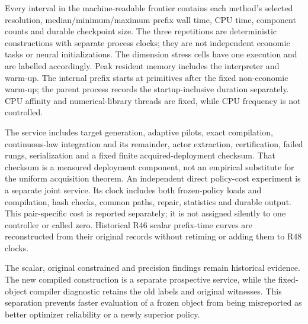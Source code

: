 Every interval in the machine-readable frontier contains each method's selected resolution, median/minimum/maximum prefix wall time, CPU time, component counts and durable checkpoint size. The three repetitions are deterministic constructions with separate process clocks; they are not independent economic tasks or neural initializations. The dimension stress cells have one execution and are labelled accordingly. Peak resident memory includes the interpreter and warm-up. The internal prefix starts at primitives after the fixed non-economic warm-up; the parent process records the startup-inclusive duration separately. CPU affinity and numerical-library threads are fixed, while CPU frequency is not controlled.

The service includes target generation, adaptive pilots, exact compilation, continuous-law integration and its remainder, actor extraction, certification, failed rungs, serialization and a fixed finite acquired-deployment checksum. That checksum is a measured deployment component, not an empirical substitute for the uniform acquisition theorem. An independent direct policy-cost experiment is a separate joint service. Its clock includes both frozen-policy loads and compilation, hash checks, common paths, repair, statistics and durable output. This pair-specific cost is reported separately; it is not assigned silently to one controller or called zero. Historical R46 scalar prefix-time curves are reconstructed from their original records without retiming or adding them to R48 clocks.

The scalar, original constrained and precision findings remain historical evidence. The new compiled construction is a separate prospective service, while the fixed-object compiler diagnostic retains the old labels and original witnesses. This separation prevents faster evaluation of a frozen object from being misreported as better optimizer reliability or a newly superior policy.
